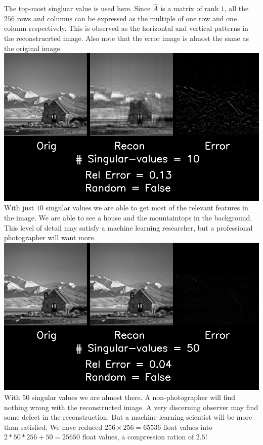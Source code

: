 \documentclass{article}
\begin{document}
The top-most singluar value is used here. Since $\hat{A}$ is a matrix of rank $1$, all the $256$ rows and columns can be expressed as the multiple of one row and one column respectively. This is observed as the horizontal and vertical patterns in the reconstrucrted image. Also note that the error image is almost the same as the original image.\\

\includegraphics[width =\textwidth]{SVD/a/Square/False/recon0010.png}\\

With just $10$ singular values we are able to get most of the relevant features in the image. We are able to see a house and the mountaintops in the background. This level of detail may satisfy a machine learning researcher, but a professional photographer will want more.\\

\includegraphics[width =\textwidth]{SVD/a/Square/False/recon0050.png}\\

With $50$ singular values we are almost there. A non-photographer will find nothing wrong with the reconstructed image. A very discerning observer may find some defect in the reconstruction. But a machine learning scientist will be more than satisfied. We have reduced $256 \times 256 = 65536$ float values into $2 * 50 * 256 + 50 = 25650$ float values, a compression ration of $2.5$!\\
\end{document}
